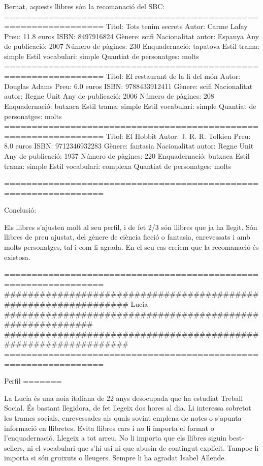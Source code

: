 Bernat, 
aquests llibres són la recomanació del SBC: 
================================================================
Titol:                   Tots tenim secrets
Autor:                   Carme Lafay
Preu:                    11.8 euros
ISBN:                    8497916824
Gènere:                  scifi
Nacionalitat autor:      Espanya
Any de publicació:       2007
Número de pàgines:       230
Enquadernació:           tapatova
Estil trama:             simple
Estil vocabulari:        simple
Quantiat de personatges: molts
================================================================
Titol:                   El restaurant de la fi del món
Autor:                   Douglas Adams
Preu:                    6.0 euros
ISBN:                    9788433912411
Gènere:                  scifi
Nacionalitat autor:      Regne Unit
Any de publicació:       2006
Número de pàgines:       208
Enquadernació:           butxaca
Estil trama:             simple
Estil vocabulari:        simple
Quantiat de personatges: molts
================================================================
Titol:                   El Hobbit
Autor:                   J. R. R. Tolkien
Preu:                    8.0 euros
ISBN:                    9712346932283
Gènere:                  fantasia
Nacionalitat autor:      Regne Unit
Any de publicació:       1937
Número de pàgines:       220
Enquadernació:           butxaca
Estil trama:             simple
Estil vocabulari:        complexa
Quantiat de personatges: molts

================================================================


Conclusió:

Els llibres s'ajusten molt al seu perfil, i de fet 2/3 són llibres que ja ha llegit. Són llibres de preu ajustat, del gènere de ciència ficció o fantasia, enrevessats i amb molts personatges, tal i com li agrada. En el seu cas creiem que la recomanació és existosa.



================================================================
################################################################
Lucia ##########################################################
################################################################
================================================================


Perfil
=======

La Lucia és una noia italiana de 22 anys desocupada que ha estudiat Treball Social. És bastant llegidora, de fet llegeix dos hores al dia. Li interessa sobretot les trames socials, enrevessades als quals sovint emplena de notes o s'apunta informació en llibretes. Evita llibres cars i no li importa el format o l'enquadernació. Llegeix a tot arreu. No li importa que els llibres siguin best-sellers, ni el vocabulari que s'hi usi ni que abusin de contingut explícit. Tampoc li importa si són gruixuts o lleugers. Sempre li ha agradat Isabel Allende.


